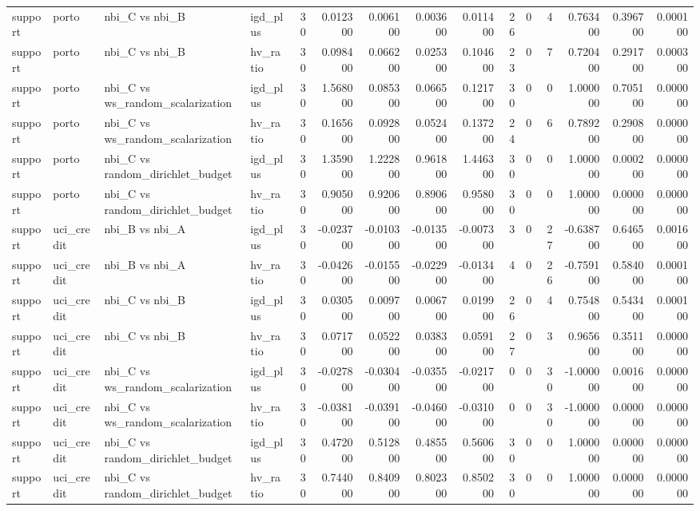 \begin{landscape}
\begin{longtable}{llllrrrrrrrrrrr}
support & porto & nbi\_C vs nbi\_B & igd\_plus & 30 & 0.012300 & 0.006100 & 0.003600 & 0.011400 & 26 & 0 & 4 & 0.763400 & 0.396700 & 0.000100 \\
support & porto & nbi\_C vs nbi\_B & hv\_ratio & 30 & 0.098400 & 0.066200 & 0.025300 & 0.104600 & 23 & 0 & 7 & 0.720400 & 0.291700 & 0.000300 \\
support & porto & nbi\_C vs ws\_random\_scalarization & igd\_plus & 30 & 1.568000 & 0.085300 & 0.066500 & 0.121700 & 30 & 0 & 0 & 1.000000 & 0.705100 & 0.000000 \\
support & porto & nbi\_C vs ws\_random\_scalarization & hv\_ratio & 30 & 0.165600 & 0.092800 & 0.052400 & 0.137200 & 24 & 0 & 6 & 0.789200 & 0.290800 & 0.000000 \\
support & porto & nbi\_C vs random\_dirichlet\_budget & igd\_plus & 30 & 1.359000 & 1.222800 & 0.961800 & 1.446300 & 30 & 0 & 0 & 1.000000 & 0.000200 & 0.000000 \\
support & porto & nbi\_C vs random\_dirichlet\_budget & hv\_ratio & 30 & 0.905000 & 0.920600 & 0.890600 & 0.958000 & 30 & 0 & 0 & 1.000000 & 0.000000 & 0.000000 \\
support & uci\_credit & nbi\_B vs nbi\_A & igd\_plus & 30 & -0.023700 & -0.010300 & -0.013500 & -0.007300 & 3 & 0 & 27 & -0.638700 & 0.646500 & 0.001600 \\
support & uci\_credit & nbi\_B vs nbi\_A & hv\_ratio & 30 & -0.042600 & -0.015500 & -0.022900 & -0.013400 & 4 & 0 & 26 & -0.759100 & 0.584000 & 0.000100 \\
support & uci\_credit & nbi\_C vs nbi\_B & igd\_plus & 30 & 0.030500 & 0.009700 & 0.006700 & 0.019900 & 26 & 0 & 4 & 0.754800 & 0.543400 & 0.000100 \\
support & uci\_credit & nbi\_C vs nbi\_B & hv\_ratio & 30 & 0.071700 & 0.052200 & 0.038300 & 0.059100 & 27 & 0 & 3 & 0.965600 & 0.351100 & 0.000000 \\
support & uci\_credit & nbi\_C vs ws\_random\_scalarization & igd\_plus & 30 & -0.027800 & -0.030400 & -0.035500 & -0.021700 & 0 & 0 & 30 & -1.000000 & 0.001600 & 0.000000 \\
support & uci\_credit & nbi\_C vs ws\_random\_scalarization & hv\_ratio & 30 & -0.038100 & -0.039100 & -0.046000 & -0.031000 & 0 & 0 & 30 & -1.000000 & 0.000000 & 0.000000 \\
support & uci\_credit & nbi\_C vs random\_dirichlet\_budget & igd\_plus & 30 & 0.472000 & 0.512800 & 0.485500 & 0.560600 & 30 & 0 & 0 & 1.000000 & 0.000000 & 0.000000 \\
support & uci\_credit & nbi\_C vs random\_dirichlet\_budget & hv\_ratio & 30 & 0.744000 & 0.840900 & 0.802300 & 0.850200 & 30 & 0 & 0 & 1.000000 & 0.000000 & 0.000000 \\
\end{longtable}\endgroup\addtocounter{table}{-1}

\end{landscape}
